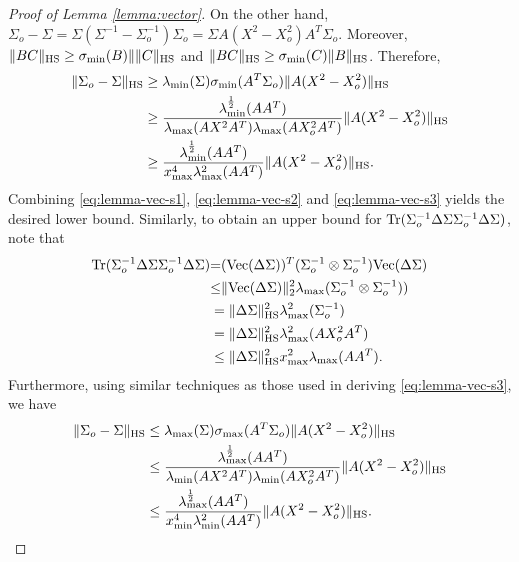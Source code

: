 \documentclass[onecolumn]{IEEEtran}
\begin{document}
\begin{proof}[Proof of Lemma \ref{lemma:vector}]
On the other hand, $\Sigma_o-\Sigma= \Sigma(\Sigma^{-1}-\Sigma_o^{-1})\Sigma_o= \Sigma A(X^2-X_o^2)A^T\Sigma_o$. Moreover, $\|BC\|_{\rm HS}\geq \sigma_{\min}(B)\|\|C\|_{\rm HS}$ and $\|BC\|_{\rm HS}\geq  \sigma_{\min}(C)\|B\|_{\rm HS}$. Therefore, 
\begin{align}
\|\Sigma_o-\Sigma\|_{\rm HS}&\geq \lambda_{\min}(\Sigma)\sigma_{\min}(A^T\Sigma_o) \|A(X^2-X_o^2)\|_{\rm HS}\nonumber\\
&\geq {\lambda^{1\over 2}_{\min}(AA^T) \over \lambda_{\max}(AX^2A^T) \lambda_{\max}(AX^2_oA^T) }\|A(X^2-X_o^2)\|_{\rm HS}\nonumber\\
&\geq {\lambda^{1\over 2}_{\min}(AA^T) \over x_{\max}^4 \lambda^2_{\max}(AA^T)  }\|A(X^2-X_o^2)\|_{\rm HS}.\label{eq:lemma-vec-s3}
\end{align}
Combining \eqref{eq:lemma-vec-s1},  \eqref{eq:lemma-vec-s2} and \eqref{eq:lemma-vec-s3} yields the desired lower bound.  Similarly, to obtain an upper bound for ${\rm Tr}(\Sigma_o^{-1}\Delta \Sigma\Sigma_o^{-1}\Delta \Sigma)$, note that
\begin{align}
{\rm Tr}(\Sigma_o^{-1}\Delta \Sigma\Sigma_o^{-1}\Delta \Sigma)& {=}({\rm Vec}( \Delta \Sigma))^T (\Sigma_o^{-1} \otimes \Sigma_o^{-1}) {\rm Vec}( \Delta \Sigma)\nonumber\\
&{\leq}  \| {\rm Vec}( \Delta \Sigma)\|_2^2 \lambda_{\max}(\Sigma_o^{-1} \otimes \Sigma_o^{-1}))\nonumber\\
&=   \|\Delta \Sigma \|^2_{\rm HS} \lambda^2_{\max}(\Sigma_o^{-1})\nonumber\\
&=     \|\Delta \Sigma \|^2_{\rm HS} \lambda^2_{\max}(AX_o^2A^T) \nonumber\\
&\leq   \|\Delta \Sigma \|^2_{\rm HS} x^2_{\max} \lambda_{\max} (AA^T). 
\end{align}
Furthermore, using similar techniques as those  used in deriving \eqref{eq:lemma-vec-s3}, we have 
\begin{align}
\|\Sigma_o-\Sigma\|_{\rm HS}&\leq \lambda_{\max}(\Sigma)\sigma_{\max}(A^T\Sigma_o) \|A(X^2-X_o^2)\|_{\rm HS}\nonumber\\
&\leq {\lambda^{1\over 2}_{\max}(AA^T) \over \lambda_{\min}(AX^2A^T) \lambda_{\min}(AX^2_oA^T) }\|A(X^2-X_o^2)\|_{\rm HS}\nonumber\\
&\leq {\lambda^{1\over 2}_{\max}(AA^T) \over x_{\min}^4 \lambda^2_{\min}(AA^T)  }\|A(X^2-X_o^2)\|_{\rm HS}.\label{eq:lemma-vec-s3}
\end{align}


\end{proof}
\end{document}
